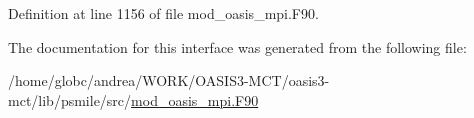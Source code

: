 Definition at line 1156 of file mod\+\_\+oasis\+\_\+mpi.\+F90.



The documentation for this interface was generated from the following file\+:\begin{DoxyCompactItemize}
\item 
/home/globc/andrea/\+W\+O\+R\+K/\+O\+A\+S\+I\+S3-\/\+M\+C\+T/oasis3-\/mct/lib/psmile/src/\hyperlink{mod__oasis__mpi_8_f90}{mod\+\_\+oasis\+\_\+mpi.\+F90}\end{DoxyCompactItemize}
